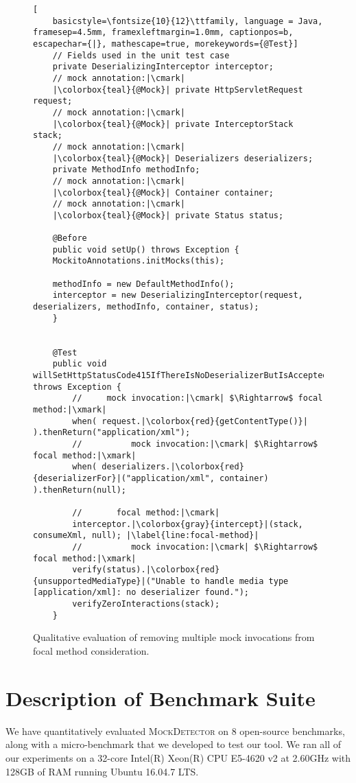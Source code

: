 \begin{figure}[p]
	\begin{lstlisting}[
	basicstyle=\fontsize{10}{12}\ttfamily, language = Java, framesep=4.5mm, framexleftmargin=1.0mm, captionpos=b, escapechar={|}, mathescape=true, morekeywords={@Test}]
	// Fields used in the unit test case
	private DeserializingInterceptor interceptor;
	// mock annotation:|\cmark|
	|\colorbox{teal}{@Mock}| private HttpServletRequest request;
	// mock annotation:|\cmark|
	|\colorbox{teal}{@Mock}| private InterceptorStack stack;
	// mock annotation:|\cmark|
	|\colorbox{teal}{@Mock}| Deserializers deserializers;
	private MethodInfo methodInfo;
	// mock annotation:|\cmark|
	|\colorbox{teal}{@Mock}| Container container;
	// mock annotation:|\cmark|
	|\colorbox{teal}{@Mock}| private Status status;
	
	@Before
	public void setUp() throws Exception {
	MockitoAnnotations.initMocks(this);
	
	methodInfo = new DefaultMethodInfo();
	interceptor = new DeserializingInterceptor(request, deserializers, methodInfo, container, status);
	}
	
	
	@Test
	public void willSetHttpStatusCode415IfThereIsNoDeserializerButIsAccepted() throws Exception {
		//     mock invocation:|\cmark| $\Rightarrow$ focal method:|\xmark|
		when( request.|\colorbox{red}{getContentType()}| ).thenReturn("application/xml");
		//     		mock invocation:|\cmark| $\Rightarrow$ focal method:|\xmark|
		when( deserializers.|\colorbox{red}{deserializerFor}|("application/xml", container) ).thenReturn(null);
		
		//       focal method:|\cmark|
		interceptor.|\colorbox{gray}{intercept}|(stack, consumeXml, null); |\label{line:focal-method}|
		//     		mock invocation:|\cmark| $\Rightarrow$ focal method:|\xmark|
		verify(status).|\colorbox{red}{unsupportedMediaType}|("Unable to handle media type [application/xml]: no deserializer found.");
		verifyZeroInteractions(stack);
	}
	\end{lstlisting}
	
	\caption{Qualitative evaluation of removing multiple mock invocations from focal method consideration.}
	\label{fig:mockExample2Evaluation}
\end{figure}

\section{Description of Benchmark Suite}

We have quantitatively evaluated \textsc{MockDetector} on 8 open-source benchmarks, along with a micro-benchmark that we developed to test our tool. We ran all of our experiments on a 32-core Intel(R) Xeon(R) CPU E5-4620 v2 at 2.60GHz with 128GB of RAM running Ubuntu 16.04.7 LTS.

